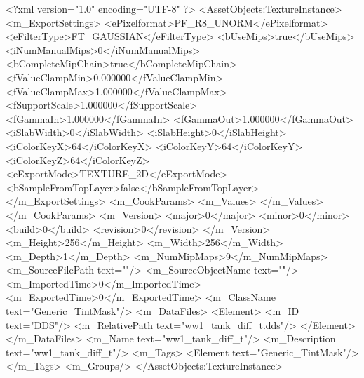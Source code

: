 <?xml version="1.0" encoding="UTF-8" ?>
<AssetObjects:TextureInstance>
<m_ExportSettings>
<ePixelformat>PF_R8_UNORM</ePixelformat>
<eFilterType>FT_GAUSSIAN</eFilterType>
<bUseMips>true</bUseMips>
<iNumManualMips>0</iNumManualMips>
<bCompleteMipChain>true</bCompleteMipChain>
<fValueClampMin>0.000000</fValueClampMin>
<fValueClampMax>1.000000</fValueClampMax>
<fSupportScale>1.000000</fSupportScale>
<fGammaIn>1.000000</fGammaIn>
<fGammaOut>1.000000</fGammaOut>
<iSlabWidth>0</iSlabWidth>
<iSlabHeight>0</iSlabHeight>
<iColorKeyX>64</iColorKeyX>
<iColorKeyY>64</iColorKeyY>
<iColorKeyZ>64</iColorKeyZ>
<eExportMode>TEXTURE_2D</eExportMode>
<bSampleFromTopLayer>false</bSampleFromTopLayer>
</m_ExportSettings>
<m_CookParams>
<m_Values>
</m_Values>
</m_CookParams>
<m_Version>
<major>0</major>
<minor>0</minor>
<build>0</build>
<revision>0</revision>
</m_Version>
<m_Height>256</m_Height>
<m_Width>256</m_Width>
<m_Depth>1</m_Depth>
<m_NumMipMaps>9</m_NumMipMaps>
<m_SourceFilePath text=""/>
<m_SourceObjectName text=""/>
<m_ImportedTime>0</m_ImportedTime>
<m_ExportedTime>0</m_ExportedTime>
<m_ClassName text="Generic_TintMask"/>
<m_DataFiles>
<Element>
<m_ID text="DDS"/>
<m_RelativePath text="ww1_tank_diff_t.dds"/>
</Element>
</m_DataFiles>
<m_Name text="ww1_tank_diff_t"/>
<m_Description text="ww1_tank_diff_t"/>
<m_Tags>
<Element text="Generic_TintMask"/>
</m_Tags>
<m_Groups/>
</AssetObjects:TextureInstance>
